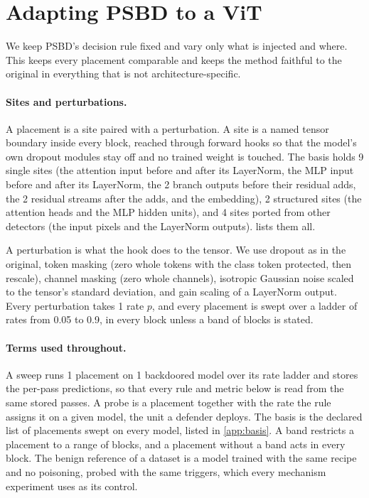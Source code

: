 \section{Adapting PSBD to a ViT}
\label{sec:method}

We keep PSBD's decision rule fixed and vary only what is injected and where. This keeps every placement comparable and keeps the method faithful to the original in everything that is not architecture-specific.

\paragraph{Sites and perturbations.}
A placement is a site paired with a perturbation. A site is a named tensor boundary inside every block, reached through forward hooks so that the model's own dropout modules stay off and no trained weight is touched. The basis holds 9 single sites (the attention input before and after its LayerNorm, the MLP input before and after its LayerNorm, the 2 branch outputs before their residual adds, the 2 residual streams after the adds, and the embedding), 2 structured sites (the attention heads and the MLP hidden units), and 4 sites ported from other detectors (the input pixels and the LayerNorm outputs).  lists them all.

A perturbation is what the hook does to the tensor. We use dropout as in the original, token masking (zero whole tokens with the class token protected, then rescale), channel masking (zero whole channels), isotropic Gaussian noise scaled to the tensor's standard deviation, and gain scaling of a LayerNorm output. Every perturbation takes 1 rate $p$, and every placement is swept over a ladder of rates from 0.05 to 0.9, in every block unless a band of blocks is stated.

\paragraph{Terms used throughout.}
A sweep runs 1 placement on 1 backdoored model over its rate ladder and stores the per-pass predictions, so that every rule and metric below is read from the same stored passes. A probe is a placement together with the rate the rule assigns it on a given model, the unit a defender deploys. The basis is the declared list of placements swept on every model, listed in \cref{app:basis}. A band restricts a placement to a range of blocks, and a placement without a band acts in every block. The benign reference of a dataset is a model trained with the same recipe and no poisoning, probed with the same triggers, which every mechanism experiment uses as its control.

